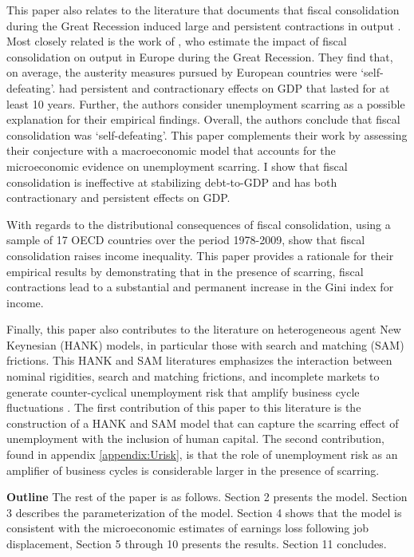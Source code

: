 This paper also relates to the literature that documents that fiscal consolidation during the Great Recession induced large and persistent contractions in output \citep{Jorda2016,FATAS2018,House2020}. Most closely related is the work of \cite{FATAS2018}, who estimate the impact of fiscal consolidation on output in Europe during the Great Recession. They find that, on average, the austerity measures pursued by European countries were `self-defeating'. had persistent and contractionary effects on GDP that lasted for at least 10 years. Further, the authors consider unemployment scarring as a possible explanation for their empirical findings. Overall, the authors conclude that fiscal consolidation was `self-defeating'. This paper complements their work by assessing their conjecture with a macroeconomic model that accounts for the microeconomic evidence on unemployment scarring. I show that fiscal consolidation is ineffective at stabilizing debt-to-GDP and has both contractionary and persistent effects on GDP. 

With regards to the distributional consequences of fiscal consolidation, using a sample of 17 OECD countries over the period 1978-2009,  \cite{Ball2013} show that fiscal consolidation raises income inequality. This paper provides a rationale for their empirical results by demonstrating that in the presence of scarring, fiscal contractions lead to a substantial and permanent increase in the Gini index for income. 


Finally, this paper also contributes to the literature on heterogeneous agent New Keynesian (HANK) models, in particular those with search and matching (SAM) frictions. This HANK and SAM literatures emphasizes the interaction between nominal rigidities, search and matching frictions, and incomplete markets to generate counter-cyclical unemployment risk that amplify business cycle fluctuations \citep{McKay2016, ravn2017job, den2018unemployment}. The first contribution of this paper to this literature is the construction of a HANK and SAM model that can capture the scarring effect of unemployment with the inclusion of human capital. The second contribution, found in appendix \ref{appendix:Urisk}, is that the role of unemployment risk as an amplifier of business cycles is considerable larger in the presence of scarring.

\textbf{Outline} The rest of the paper is as follows. Section 2 presents the model. Section 3 describes the parameterization of the model. Section 4 shows that the model is consistent with the microeconomic estimates of earnings loss following job displacement, Section 5 through 10 presents the results. Section 11 concludes. \\ 